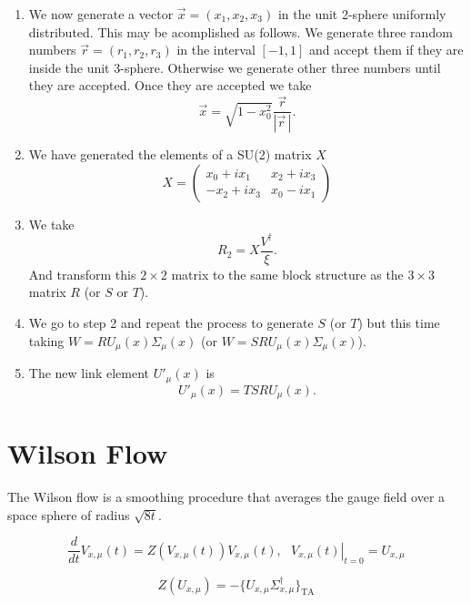 \documentclass[12pt,a4paper]{article}
\begin{document}
\begin{enumerate}
	\item We now generate a vector $\vec{x} = (x_1,x_2,x_3)$ in the unit 2-sphere uniformly distributed. This may be acomplished as follows. We generate three random numbers $\vec{r} = (r_1,r_2,r_3)$ in the interval $[-1,1]$ and accept them if they are inside the unit 3-sphere. Otherwise we generate other three numbers until they are accepted. Once they are accepted we take
	\begin{equation}
		\vec{x} = \sqrt{1 - x_0^2} \frac{\vec{r}}{|\vec{r}\,|}.
	\end{equation}
	\item We have generated the elements of a SU(2) matrix $X$
	\begin{equation}
		X = \begin{pmatrix}
			x_0 + ix_1 & x_2 + ix_3 \\
		   -x_2 + ix_3 & x_0 - ix_1
		\end{pmatrix}
	\end{equation}
	\item We take
		\begin{equation}
			R_2 = X \frac{V^{\dagger}}{\xi}.
		\end{equation}
		And transform this $2\times 2$ matrix to the same block structure as the $3\times 3$ matrix $R$ (or $S$ or $T$).
		\item We go to step 2 and repeat the process to generate $S$ (or $T$) but this time taking $W = R U_{\mu}(x)\Sigma_{\mu}(x)$ (or $W = S R U_{\mu}(x)\Sigma_{\mu}(x)$).
	\item The new link element $U'_{\mu}(x)$ is
	\begin{equation}
		U'_{\mu}(x) = T S R U_{\mu}(x).
	\end{equation}			
\end{enumerate}


\section{Wilson Flow}

The Wilson flow is a smoothing procedure that averages the gauge field over a space sphere of radius $\sqrt{8t}$. 

\begin{equation}
    \frac{d}{dt}V_{x,\mu}(t) = Z(V_{x,\mu}(t))V_{x,\mu}(t) , \ \ \  \left. {V_{x,\mu}(t)}\right|_{t = 0} = U_{x,\mu}
\end{equation}

\begin{equation}
         Z(U_{x,\mu}) = -\{U_{x,\mu}\Sigma_{x,\mu}^{\dagger}\}_{\text{TA}}
\end{equation}
\end{document}
